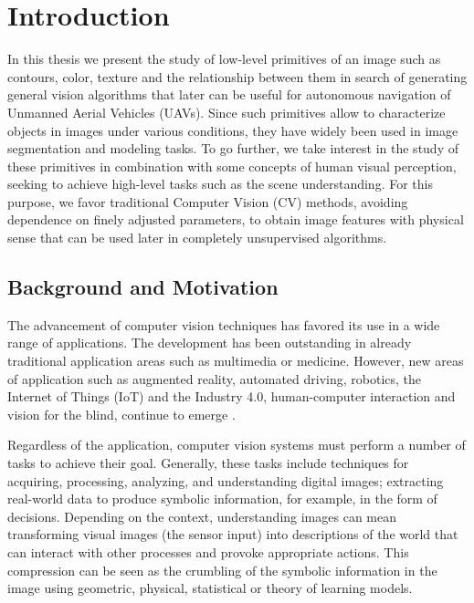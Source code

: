 \chapter*{Introduction}
In this thesis we present the study of low-level primitives of an image such as contours, color, texture and the relationship between them in search of generating general vision algorithms that later can be useful for autonomous navigation of Unmanned Aerial Vehicles (UAVs). Since such primitives allow to characterize objects in images under various conditions, they have widely been used in image segmentation and modeling tasks. To go further, we take interest in the study of these primitives in combination with some concepts of human visual perception, seeking to achieve high-level tasks such as the scene understanding. For this purpose, we favor traditional Computer Vision (CV) methods, avoiding dependence on finely adjusted parameters, to obtain image features with physical sense that can be used later in completely unsupervised algorithms.

\section*{Background and Motivation}

The advancement of computer vision techniques has favored its use in a wide range of applications. The development has been outstanding in already traditional application areas such as multimedia or medicine. However, new areas of application such as augmented reality, automated driving, robotics, the Internet of Things (IoT) and the Industry 4.0, human-computer interaction and vision for the blind, continue to emerge . 

Regardless of the application, computer vision systems must perform a number of tasks to achieve their goal. Generally, these tasks include techniques for acquiring, processing, analyzing, and understanding digital images; extracting real-world data to produce symbolic information, for example, in the form of decisions. Depending on the context, understanding images can mean transforming visual images (the sensor input) into descriptions of the world that can interact with other processes and provoke appropriate actions. This compression can be seen as the crumbling of the symbolic information in the image using geometric, physical, statistical or theory of learning models.

